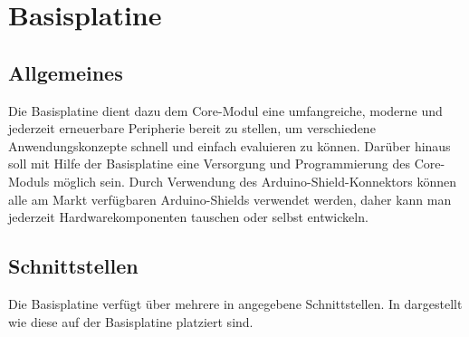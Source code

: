 \section{Basisplatine}
\label{sec:basisplatine}


\subsection{Allgemeines}
\label{sec:basisplatine-allgemeines}
Die \gls{Basisplatine} dient dazu dem \gls{Core-Modul} eine umfangreiche, moderne und jederzeit erneuerbare Peripherie bereit zu stellen, um verschiedene Anwendungskonzepte schnell und einfach evaluieren zu können. Darüber hinaus soll mit Hilfe der \gls{Basisplatine} eine Versorgung und Programmierung des \gls{Core-Modul}s möglich sein. Durch Verwendung des Arduino-Shield-Konnektors können alle am Markt verfügbaren Arduino-Shields verwendet werden, daher kann man jederzeit Hardwarekomponenten tauschen oder selbst entwickeln.

\subsection{Schnittstellen}
\label{sec:basisplatine-schnittstellen}

Die \gls{Basisplatine} verfügt über mehrere in  angegebene Schnittstellen. In  dargestellt wie diese auf der \gls{Basisplatine} platziert sind.


